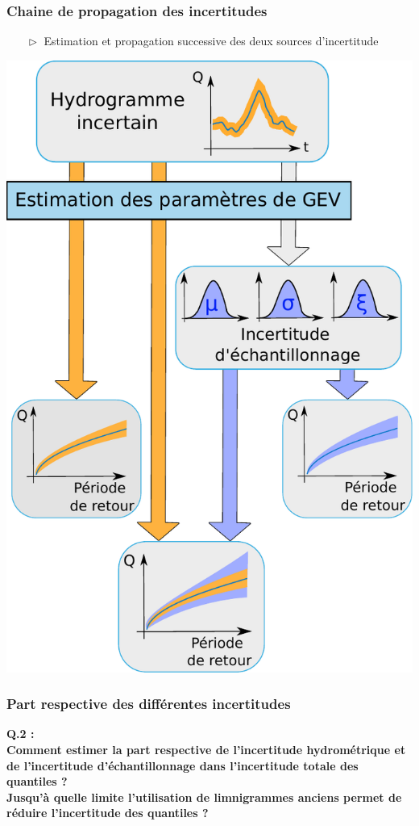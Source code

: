 \documentclass[compress,9pt]{beamer}
\begin{document}
		\begin{frame}
		\frametitle{Chaine de propagation des incertitudes}
		\begin{minipage}{0.45\textwidth}
			\begin{itemize}
				\vfill
				\item [$\vartriangleright$] Estimation et propagation successive des deux sources d'incertitude\\
			\end{itemize}
			\vfill
		\end{minipage}
		\hfill		
		\begin{minipage}{0.53\textwidth}
			\centering
			\vfill
			\includegraphics[width = .55\textwidth]{./Figures/uPropagtot.pdf}
		\end{minipage}
	\end{frame}
	                
	\begin{frame}
		\frametitle{Part respective des différentes incertitudes}
		\centering
		\vfill
		\Large{\textbf{Q.2 :\\
		\vfill
		Comment estimer la part respective de l'incertitude hydrométrique et de l'incertitude d'échantillonnage dans l'incertitude totale des quantiles ? \\
		\vfill
		Jusqu'à quelle limite l'utilisation de limnigrammes anciens permet de réduire l'incertitude des quantiles ?} }%
		\vfill
	\end{frame}
	
\end{document}
